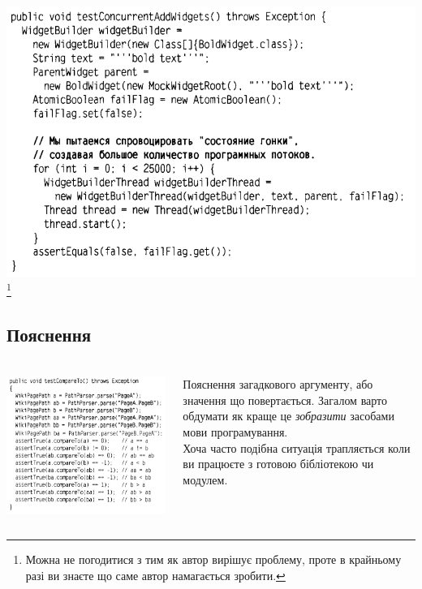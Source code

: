\documentclass[12pt,pdf,utf8,ukrainian,aspectratio=169]{beamer}
\makeatletter
\newcommand*{\currentname}{\@currentlabelname}
\makeatother
\begin{document}
	\begin{frame}\frametitle{\currentname}
		\includegraphics[scale=0.4]{clean_code_5_2.png}
		\footnote{Можна не погодитися з тим як автор вирішує проблему, проте в крайньому разі ви знаєте що саме автор намагається зробити.}
		\hfill	
	\end{frame}

	\subsection{Пояснення}
	\begin{frame}\frametitle{\currentname}
		\begin{columns}
			\begin{column}{7cm}
				\includegraphics[scale=0.45]{clean_code_6.png}
			\end{column}
			\begin{column}{5cm} 
				\small
				Пояснення загадкового аргументу, або значення що повертається. Загалом варто обдумати як краще це \textit{зобразити} засобами мови програмування. \\
				Хоча часто подібна ситуація трапляється коли ви працюєте з готовою бібліотекою чи модулем.
			\end{column}
		\end{columns}	
	\end{frame}
\end{document}
